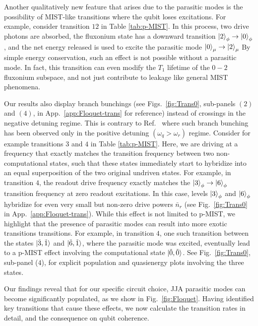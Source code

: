 \documentclass[%
reprint,
superscriptaddress,
 amsmath,amssymb,
 aps,
 prx,
longbibliography,
floatfix,
]{revtex4-2}
\begin{document}
Another qualitatively new feature that arises due to the parasitic modes is the possibility of MIST-like transitions where the qubit loses excitations.  For example, consider transition $12$ in Table \ref{tab:p-MIST}. In this process, two drive photons are absorbed, the fluxonium state has a downward transition $\ket{2}_\phi\rightarrow\ket{0}_\phi$, and the net energy released is used to excite the parasitic mode $\ket{0}_\mu\rightarrow \ket{2}_\mu$ By simple energy conservation, such an effect is not possible without a parasitic mode. In fact, this transition can even modify the $T_1$ lifetime of the $0-2$ fluxonium subspace, and not just contribute to leakage like general MIST phenomena.

Our results also display branch bunchings (see Figs.~\ref{fig:Trans0}, sub-panels $(2)$ and $(4)$, in App.~\ref{app:Floquet-trans} for reference) instead of crossings in the negative detuning regime. This is contrary to Ref.~\cite{dumas2024unified} where such branch bunching has been observed only in the positive detuning $(\omega_q>\omega_r)$ regime.  Consider for example transitions $3$ and $4$ in Table \ref{tab:p-MIST}. Here, we are  driving at a frequency that exactly matches the transition frequency between two non-computational states, such that these states immediately start to hybridize into an equal superposition of the two 
original undriven states.  For example, in transition $4$, the readout drive frequency exactly matches the $\ket{3}_\phi \rightarrow \ket{6}_\phi$ transition frequency at zero readout excitations. In this case, levels $\ket{3}_\phi$ and $\ket{6}_\phi$ hybridize for even very small but non-zero drive powers $\bar n_r$  (see Fig.~\ref{fig:Trans0} in App.~\ref{app:Floquet-trans}). While this effect is not limited to p-MIST, we highlight that the presence of parasitic modes can result into more exotic transitions transitions. For example, in transition  $4$, one such transition between the states $\ket{\tilde{3},\tilde{1}}$ and $\ket{\tilde{6},\tilde{1}}$, where the parasitic mode was excited, eventually lead to a p-MIST effect involving the computational state $\ket{\tilde{0},\tilde{0}}$. See Fig.~\ref{fig:Trans0}, sub-panel ($4$), for explicit population and quasienergy plots involving the three states.



Our findings reveal that for our specific circuit choice, JJA parasitic modes can become significantly populated, as we show in Fig.~\ref{fig:Floquet}. Having identified key transitions that cause these effects, we now calculate the transition rates in detail, and the consequence on qubit coherence. 
\end{document}
